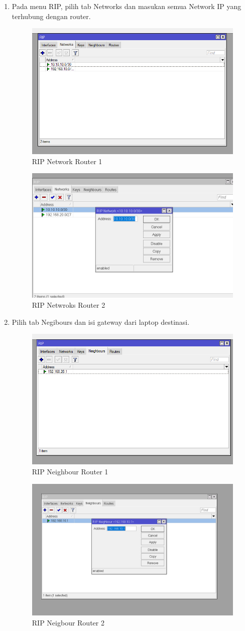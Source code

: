 \begin{enumerate}
    \item Pada menu RIP, pilih tab Networks dan masukan semua Network IP yang terhubung dengan router.
        \begin{figure}[H]
            \centering
            \includegraphics[width=0.5\linewidth]{P1/img/rip networks.png}
            \caption{RIP Network Router 1}
            \label{fig:enter-label}
        \end{figure}
        \begin{figure}[H]
            \centering
            \includegraphics[width=0.5\linewidth]{P1/img/RIP Net.png}
            \caption{RIP Netwroks Router 2}
            \label{fig:enter-label}
        \end{figure}

    \item Pilih tab Negibours dan isi gateway dari laptop destinasi.
        \begin{figure}[H]
            \centering
            \includegraphics[width=0.5\linewidth]{P1/img/rip neighbours.png}
            \caption{RIP Neighbour Router 1}
            \label{fig:enter-label}
        \end{figure}
        \begin{figure}[H]
            \centering
            \includegraphics[width=0.5\linewidth]{P1/img/RIp Neighbvours.png}
            \caption{RIP Neigbour Router 2}
            \label{fig:enter-label}
        \end{figure}


\end{enumerate}
